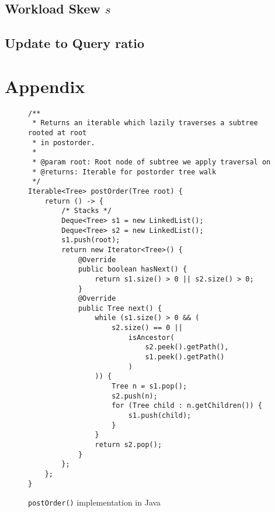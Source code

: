 \documentclass[abstracton,12pt]{scrartcl}
\theoremstyle{definition}
\begin{document}
\label{sec:qtp-queried-nodes}

\subsection{Workload Skew $s$}

\label{sec:skew}

\subsection{Update to Query ratio}

\label{sec:update-query-ratio}

\newpage




\newpage

\section{Appendix}

\begin{figure}[H]
  \centering
  \small
  \begin{framed}
\begin{verbatim}
/**
 * Returns an iterable which lazily traverses a subtree rooted at root
 * in postorder.
 *
 * @param root: Root node of subtree we apply traversal on
 * @returns: Iterable for postorder tree walk
 */
Iterable<Tree> postOrder(Tree root) {
    return () -> {
        /* Stacks */
        Deque<Tree> s1 = new LinkedList();
        Deque<Tree> s2 = new LinkedList();
        s1.push(root);
        return new Iterator<Tree>() {
            @Override
            public boolean hasNext() {
                return s1.size() > 0 || s2.size() > 0;
            }
            @Override
            public Tree next() {
                while (s1.size() > 0 && (
                    s2.size() == 0 ||
                        isAncestor(
                            s2.peek().getPath(),
                            s1.peek().getPath()
                        )
                )) {
                    Tree n = s1.pop();
                    s2.push(n);
                    for (Tree child : n.getChildren()) {
                        s1.push(child);
                    }
                }
                return s2.pop();
            }          
        };
    };
}
\end{verbatim}
  \end{framed}
  \caption{\texttt{postOrder()} implementation in Java}
  \label{fig:java_postorder}
\end{figure}
\end{document}
